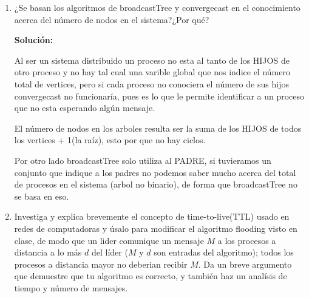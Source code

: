 \documentclass[8pt, letterpaper]{article}
\begin{document}
\begin{enumerate}
\begin{itemize}
  \hspace{0.2cm} {\bf Al recibir $<${\it ok}$>$ de algún puerto} en HIJOS:
  \hfill{}. vecinos++
  \hfill{}. {\bf Si} vecinos == |HIJOS| entonces:
  \hfill{}.\hspace{0.5cm} {\bf Si} soyRaiz entonces:
  \hfill{}.\hspace{1cm} {\bf Reportar terminación}
  \hfill{}.\hspace{0.5cm} {\bf Sino}
  \hfill{}. \hspace{1cm}{\bf send}$(<${\it ok}$>)$ a PADRE
  \hfill\break
  \rule{1\textwidth}{0.2mm}

  \hfill\break
  \end{itemize}
  
  \hfill\break
  \rmfamily
\item ¿Se basan los algoritmos de broadcastTree y convergecast en el
  conocimiento acerca del número de nodos en el sistema?¿Por qué?
  
  \hfill\break
  \ttfamily
  {\bf Solución:}

  Al ser un sistema distribuido un proceso no esta al tanto de los HIJOS de
  otro proceso y no hay tal cual una varible global que nos indice el número
  total de vertices, pero si cada proceso no conociera el número de sus
  hijos convergecast no funcionaría, pues es lo que le permite identificar
  a un proceso que no esta esperando algún mensaje.

  El número de nodos en los arboles resulta ser la suma de los HIJOS de todos
  los vertices + 1(la raíz), esto por que no hay ciclos.
  
  \hfill\break
  Por otro lado broadcastTree solo utiliza al PADRE, si tuvieramos un conjunto
  que indique a los padres no podemos saber mucho acerca del total de procesos
  en el sistema (arbol no binario), de forma que broadcastTree no se basa en
  eso.
  \hfill\break
  \rmfamily
\item Investiga y explica brevemente el concepto de time-to-live(TTL) usado en
  redes de computadoras y úsalo para modificar el algoritmo flooding visto en
  clase, de modo que un lider comunique un mensaje $M$ a los procesos a
  distancia a lo más $d$ del líder ($M$ y $d$ son entradas del algoritmo);
  todos los procesos a distancia mayor no deberian recibir $M$. Da un breve
  argumento que demuestre que tu algoritmo es correcto, y también haz un
  analísis de tiempo y número de mensajes.
  

\end{enumerate}
\end{document}

